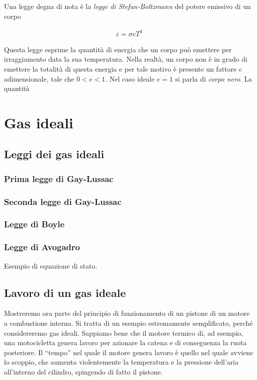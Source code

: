 Una legge degna di nota è la \textit{legge di Stefan-Boltzmann} del
potere emissivo di un corpo

\begin{align}
    \varepsilon = \sigma e T^4
\end{align}

\noindent Questa legge esprime la quantità di energia che un corpo
può emettere per irraggiamento data la sua temperatura. Nella realtà,
un corpo non è in grado di emettere la totalità di questa energia
e per tale motivo è presente un fattore $e$ adimensionale, tale che
$0 < e < 1$. Nel caso ideale $e = 1$ si parla di \textit{corpo nero}.
La quantità

\section{Gas ideali}

\subsection{Leggi dei gas ideali}

\subsubsection*{Prima legge di Gay-Lussac}
\subsubsection*{Seconda legge di Gay-Lussac}
\subsubsection*{Legge di Boyle}

\subsubsection*{Legge di Avogadro}
Esempio di equazione di stato.

\subsection{Lavoro di un gas ideale}
Mostreremo ora parte del principio di funzionamento di un pistone
di un motore a combustione interna. Si tratta di un esempio estremamente
semplificato, perché considereremo gas ideali.
Sappiamo bene che il motore termico di, ad esempio, una motocicletta
genera lavoro per azionare la catena e di conseguenza la ruota posteriore.
Il ``tempo'' nel quale il motore genera lavoro è quello nel quale
avviene lo scoppio, che aumenta violentemente la temperatura e la
pressione dell'aria all'interno del cilindro, spingendo di fatto il
pistone.

